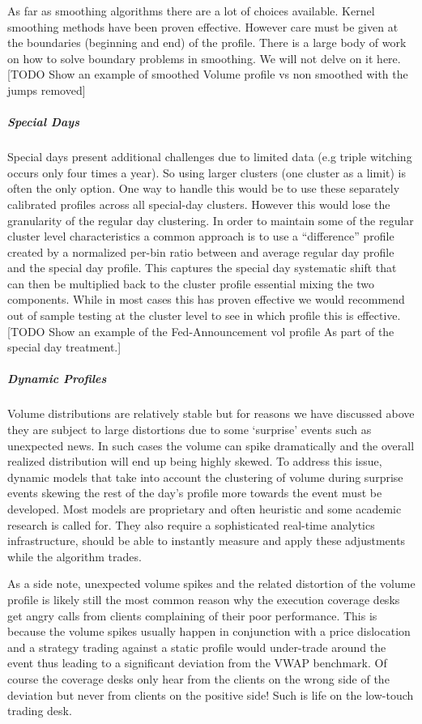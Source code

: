 As far as smoothing algorithms there are a lot of choices available. Kernel smoothing methods have been proven effective. However  care must be given at the boundaries (beginning and end) of the profile. There is a large body of work on how to solve boundary problems in smoothing. We will not delve on it here. [TODO Show an example of smoothed Volume profile vs non smoothed with the jumps removed]


\subparagraph{Special Days}

Special days present additional challenges due to limited data (e.g triple witching occurs only four times a year). So using larger clusters (one cluster as a limit) is often the only option. One way to handle this would be to use these separately calibrated profiles across all special-day clusters. However this would lose the granularity of the regular day clustering. In order to maintain some of the  regular cluster level characteristics a common approach is to use a ``difference'' profile created by a normalized per-bin ratio between and average regular day profile and the special day profile. This captures the special day systematic shift that can then be multiplied back to the cluster profile essential mixing the two components. While in most cases this has proven effective we would recommend out of sample testing at the cluster level to see in which profile this is effective. [TODO Show an example of the Fed-Announcement vol profile As part of the special day treatment.]


\subparagraph{Dynamic Profiles}

Volume distributions are relatively stable but for reasons we have discussed above they are subject to large distortions due to some `surprise' events such as unexpected news. In such cases the volume can spike dramatically and the overall realized distribution will end up being highly skewed.  To address this issue, dynamic models that take into account the clustering of volume during surprise events skewing the rest of the day's profile more towards the event must be developed. Most models are proprietary and often heuristic and some academic research is called for. They also require a sophisticated real-time analytics infrastructure, should be able to instantly measure and apply these adjustments while the algorithm trades.


As a side note, unexpected volume spikes and the related distortion of the volume profile is likely still the most common reason why the execution coverage desks get angry calls from clients complaining of their poor performance. This is because the volume spikes usually happen in conjunction with a price dislocation and a strategy trading against a static profile would under-trade around the event thus leading to a significant deviation from the VWAP benchmark. Of course the coverage desks only hear from the clients on the wrong side of the deviation but never from clients on the positive side! Such is life on the low-touch trading desk.



